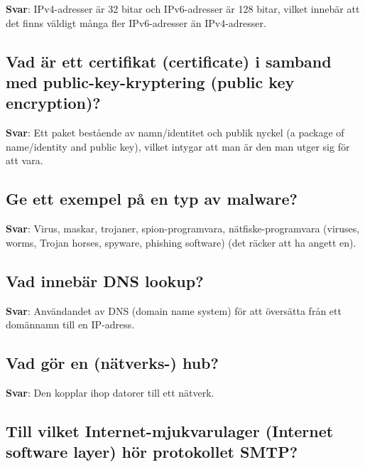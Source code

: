 \documentclass[a4paper,11pt,oneside]{article}
\begin{document}
\begin{sloppypar}
\textbf{Svar}: IPv4-adresser \"ar 32 bitar och IPv6-adresser \"ar 128 bitar, vilket inneb\"ar att det finns v\"aldigt m\r{a}nga fler IPv6-adresser \"an IPv4-adresser.



\subsection{Vad \"ar ett certifikat (certificate) i samband med public-key-kryptering (public key encryption)?}

\label{q:141:sa:sv:True}

\textbf{Svar}: Ett paket best\r{a}ende av namn/identitet och publik nyckel (a package of name/identity and public key), vilket intygar att man \"ar den man utger sig f\"or att vara.



\subsection{Ge ett exempel p\r{a} en typ av malware?}

\label{q:142:sa:sv:True}

\textbf{Svar}: Virus, maskar, trojaner, spion-programvara, n\"atfiske-programvara (viruses, worms, Trojan horses, spyware, phishing software) (det r\"acker att ha angett en).



\subsection{Vad inneb\"ar DNS lookup?}

\label{q:143:sa:sv:True}

\textbf{Svar}: Anv\"andandet av DNS (domain name system) f\"or att \"overs\"atta fr\r{a}n ett dom\"annamn till en IP-adress.



\subsection{Vad g\"or en (n\"atverks-) hub?}

\label{q:144:sa:sv:True}

\textbf{Svar}: Den kopplar ihop datorer till ett n\"atverk.



\subsection{Till vilket Internet-mjukvarulager (Internet software layer) h\"or protokollet SMTP?}


\end{sloppypar}
\end{document}

